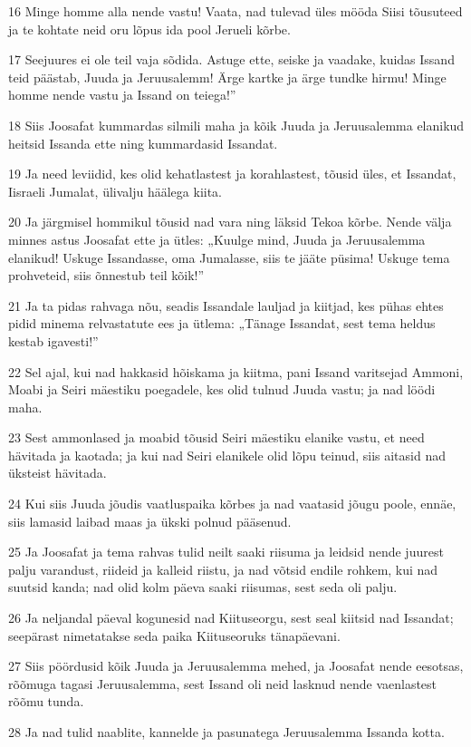 \par 16 Minge homme alla nende vastu! Vaata, nad tulevad üles mööda Siisi tõusuteed ja te kohtate neid oru lõpus ida pool Jerueli kõrbe.
\par 17 Seejuures ei ole teil vaja sõdida. Astuge ette, seiske ja vaadake, kuidas Issand teid päästab, Juuda ja Jeruusalemm! Ärge kartke ja ärge tundke hirmu! Minge homme nende vastu ja Issand on teiega!”
\par 18 Siis Joosafat kummardas silmili maha ja kõik Juuda ja Jeruusalemma elanikud heitsid Issanda ette ning kummardasid Issandat.
\par 19 Ja need leviidid, kes olid kehatlastest ja korahlastest, tõusid üles, et Issandat, Iisraeli Jumalat, ülivalju häälega kiita.
\par 20 Ja järgmisel hommikul tõusid nad vara ning läksid Tekoa kõrbe. Nende välja minnes astus Joosafat ette ja ütles: „Kuulge mind, Juuda ja Jeruusalemma elanikud! Uskuge Issandasse, oma Jumalasse, siis te jääte püsima! Uskuge tema prohveteid, siis õnnestub teil kõik!”
\par 21 Ja ta pidas rahvaga nõu, seadis Issandale lauljad ja kiitjad, kes pühas ehtes pidid minema relvastatute ees ja ütlema: „Tänage Issandat, sest tema heldus kestab igavesti!”
\par 22 Sel ajal, kui nad hakkasid hõiskama ja kiitma, pani Issand varitsejad Ammoni, Moabi ja Seiri mäestiku poegadele, kes olid tulnud Juuda vastu; ja nad löödi maha.
\par 23 Sest ammonlased ja moabid tõusid Seiri mäestiku elanike vastu, et need hävitada ja kaotada; ja kui nad Seiri elanikele olid lõpu teinud, siis aitasid nad üksteist hävitada.
\par 24 Kui siis Juuda jõudis vaatluspaika kõrbes ja nad vaatasid jõugu poole, ennäe, siis lamasid laibad maas ja ükski polnud pääsenud.
\par 25 Ja Joosafat ja tema rahvas tulid neilt saaki riisuma ja leidsid nende juurest palju varandust, riideid ja kalleid riistu, ja nad võtsid endile rohkem, kui nad suutsid kanda; nad olid kolm päeva saaki riisumas, sest seda oli palju.
\par 26 Ja neljandal päeval kogunesid nad Kiituseorgu, sest seal kiitsid nad Issandat; seepärast nimetatakse seda paika Kiituseoruks tänapäevani.
\par 27 Siis pöördusid kõik Juuda ja Jeruusalemma mehed, ja Joosafat nende eesotsas, rõõmuga tagasi Jeruusalemma, sest Issand oli neid lasknud nende vaenlastest rõõmu tunda.
\par 28 Ja nad tulid naablite, kannelde ja pasunatega Jeruusalemma Issanda kotta.
